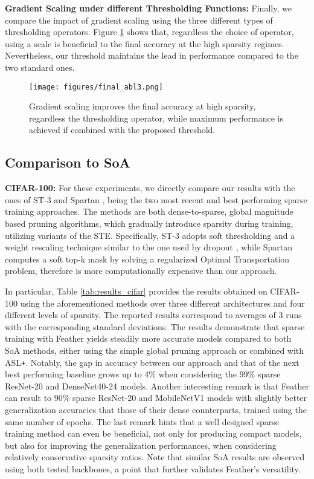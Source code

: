 \documentclass{article}
\begin{document}
\noindent \textbf{Gradient Scaling under different Thresholding Functions:}
\noindent Finally, we compare the impact of gradient scaling using the three different types of thresholding operators. Figure \ref{fig:abl3}  shows that, regardless the choice of operator, using a scale  is beneficial to the final accuracy at the high sparsity regimes. Nevertheless, our threshold maintains the lead in performance compared to the two standard ones.


\begin{figure}[H]
	\centering
  \texttt{[image: figures/final\_abl3.png]}
\caption{Gradient scaling improves the final accuracy at high sparsity, regardless the thresholding operator, while maximum performance is achieved if combined with the proposed threshold.}
\label{fig:abl3}
\end{figure}


 
\subsection{Comparison to SoA}


\noindent \textbf{CIFAR-100:}
\noindent For these experiments, we directly compare our results with the ones of ST-3 \cite{vanderschueren2023straight} and Spartan \cite{tai2022spartan}, being the two most recent and best performing sparse training approaches. The methods are both dense-to-sparse, global magnitude based pruning algorithms, which gradually introduce sparsity during training, utilizing variants of the STE. Specifically, ST-3 adopts soft thresholding and a weight rescaling technique similar to the one used by dropout \cite{srivastava2014dropout}, while Spartan computes a soft top-k mask by solving a regularized Optimal Transportation problem, therefore is more computationally expensive than our approach.

In particular, Table \ref{tab:results_cifar} provides the results obtained on CIFAR-100 using the aforementioned methods over three different architectures and four different levels of sparsity. The reported results correspond to averages of 3 runs with the corresponding standard deviations. The results demonstrate that sparse training with Feather yields steadily more accurate models compared to both SoA methods, either using the simple global pruning approach or combined with ASL\texttt{+}. Notably, the gap in accuracy between our approach and that of the next best performing baseline grows up to 4\% when considering the 99\% sparse ResNet-20 and DenseNet40-24 models. Another interesting remark is that Feather can result to 90\% sparse ResNet-20 and MobileNetV1 models with slightly better generalization accuracies that those of their dense  counterparts, trained using the same number of epochs. The last remark hints that a well designed sparse training method can even be beneficial, not only for producing compact models, but also for improving the generalization performances, when considering relatively conservative sparsity ratios. Note that similar SoA results are observed using both tested backbones, a point that further validates Feather's versatility.
\end{document}
